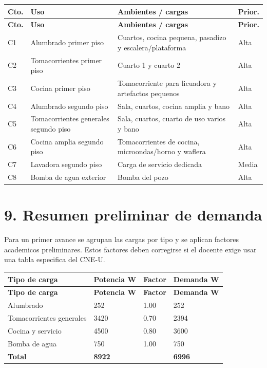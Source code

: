 \documentclass[12pt,a4paper]{article}
\begin{document}
\begin{longtable}{L{1.2cm}L{3.7cm}L{7.2cm}L{1.7cm}}
\toprule
\textbf{Cto.} & \textbf{Uso} & \textbf{Ambientes / cargas} & \textbf{Prior.} \\
\midrule
\endfirsthead
\toprule
\textbf{Cto.} & \textbf{Uso} & \textbf{Ambientes / cargas} & \textbf{Prior.} \\
\midrule
\endhead
C1 & Alumbrado primer piso & Cuartos, cocina pequena, pasadizo y escalera/plataforma & Alta \\
C2 & Tomacorrientes primer piso & Cuarto 1 y cuarto 2 & Alta \\
C3 & Cocina primer piso & Tomacorriente para licuadora y artefactos pequenos & Alta \\
C4 & Alumbrado segundo piso & Sala, cuartos, cocina amplia y bano & Alta \\
C5 & Tomacorrientes generales segundo piso & Sala, cuartos, cuarto de uso varios y bano & Alta \\
C6 & Cocina amplia segundo piso & Tomacorrientes de cocina, microondas/horno y waflera & Alta \\
C7 & Lavadora segundo piso & Carga de servicio dedicada & Media \\
C8 & Bomba de agua exterior & Bomba del pozo & Alta \\
\bottomrule
\end{longtable}

\section*{9. Resumen preliminar de demanda}

Para un primer avance se agrupan las cargas por tipo y se aplican factores academicos preliminares. Estos factores deben corregirse si el docente exige usar una tabla especifica del CNE-U.

\begin{longtable}{L{4.5cm}R{3cm}R{2.8cm}R{3cm}}
\toprule
\textbf{Tipo de carga} & \textbf{Potencia W} & \textbf{Factor} & \textbf{Demanda W} \\
\midrule
\endfirsthead
\toprule
\textbf{Tipo de carga} & \textbf{Potencia W} & \textbf{Factor} & \textbf{Demanda W} \\
\midrule
\endhead
Alumbrado & 252 & 1.00 & 252 \\
Tomacorrientes generales & 3420 & 0.70 & 2394 \\
Cocina y servicio & 4500 & 0.80 & 3600 \\
Bomba de agua & 750 & 1.00 & 750 \\
\midrule
\textbf{Total} & \textbf{8922} &  & \textbf{6996} \\
\bottomrule
\end{longtable}
\end{document}
